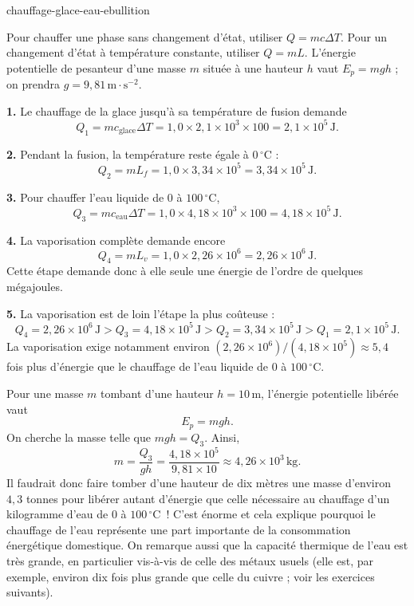 \begin{exo}{chauffage-glace-eau-ebullition}
\begin{indication}
Pour chauffer une phase sans changement d'état, utiliser $Q=mc\Delta T$. Pour un changement d'état à température constante, utiliser $Q=mL$. L'énergie potentielle de pesanteur d'une masse $m$ située à une hauteur $h$ vaut $E_p=mgh$ ; on prendra $g=9{,}81\,\text{m}\!\cdot\!\text{s}^{-2}$.
\end{indication}

\begin{solution}
\textbf{1.} Le chauffage de la glace jusqu'à sa température de fusion demande
\[
Q_1=mc_{\text{glace}}\Delta T
=1{,}0\times2{,}1\times10^3\times100
=2{,}1\times10^5\,\text{J}.
\]

\textbf{2.} Pendant la fusion, la température reste égale à $0\,{}^\circ\text{C}$ :
\[
Q_2=mL_f=1{,}0\times3{,}34\times10^5
=3{,}34\times10^5\,\text{J}.
\]

\textbf{3.} Pour chauffer l'eau liquide de $0$ à $100\,{}^\circ\text{C}$,
\[
Q_3=mc_{\text{eau}}\Delta T
=1{,}0\times4{,}18\times10^3\times100
=4{,}18\times10^5\,\text{J}.
\]

\textbf{4.} La vaporisation complète demande encore
\[
Q_4=mL_v=1{,}0\times2{,}26\times10^6
=2{,}26\times10^6\,\text{J}.
\]
Cette étape demande donc à elle seule une énergie de l'ordre de quelques mégajoules.

\textbf{5.} La vaporisation est de loin l'étape la plus coûteuse :
\[
Q_4=2{,}26\times10^6\,\text{J}
>Q_3=4{,}18\times10^5\,\text{J}
>Q_2=3{,}34\times10^5\,\text{J}
>Q_1=2{,}1\times10^5\,\text{J}.
\]
La vaporisation exige notamment environ $(2{,}26\times10^6)/(4{,}18\times10^5)\approx5{,}4$ fois plus d'énergie que le chauffage de l'eau liquide de $0$ à $100\,{}^\circ\text{C}$.

Pour une masse $m$ tombant d'une hauteur $h=10\,\text{m}$, l'énergie potentielle libérée vaut
\[
E_p=mgh.
\]
On cherche la masse telle que $mgh=Q_3$. Ainsi,
\[
m=\frac{Q_3}{gh}
=\frac{4{,}18\times10^5}{9{,}81\times10}
\approx4{,}26\times10^3\,\text{kg}.
\]
Il faudrait donc faire tomber d'une hauteur de dix mètres une masse d'environ $4{,}3$ tonnes pour libérer autant d'énergie que celle nécessaire au chauffage d'un kilogramme d'eau de $0$ à $100\,{}^\circ\text{C}$~!
C'est énorme et cela explique pourquoi le chauffage de l'eau représente une part importante de la consommation énergétique domestique.
On remarque aussi que la capacité thermique de l'eau est très grande,
en particulier vis-à-vis de celle des métaux usuels (elle est, par exemple, environ dix fois plus grande que celle du cuivre ; voir les exercices suivants).


\end{solution}
\end{exo}
